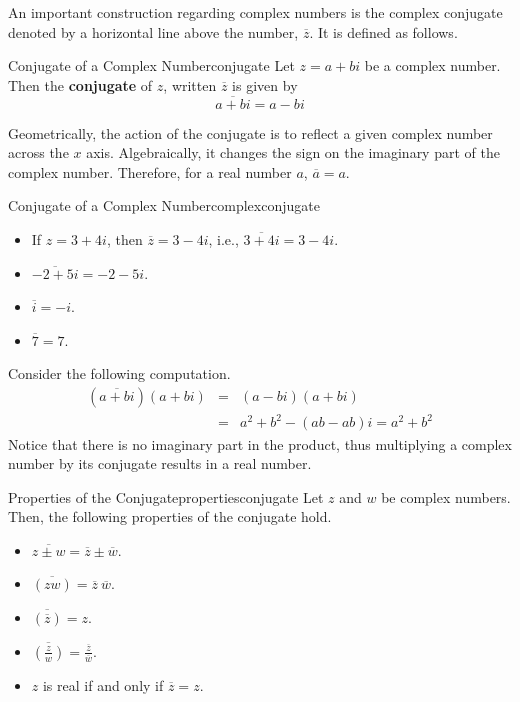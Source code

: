 An important construction regarding complex numbers is the complex
conjugate denoted by a horizontal line above the number, $\overline{z}$. It
is defined as follows.

\begin{definition}{Conjugate of a Complex Number}{conjugate}
Let $z = a+bi$ be a complex number. Then the \textbf{conjugate} of $z$, written $\overline{z}$ is given by 
\begin{equation*}
\overline{a+bi}= a-bi
\end{equation*}
\end{definition}

Geometrically, the action of the conjugate is to reflect a given complex number across the $x$ axis.
Algebraically, it changes the sign on the imaginary part of the complex number. Therefore, for a real number $a$, $\overline{a} = a$. 

\begin{example}{Conjugate of a Complex Number}{complexconjugate}
\begin{itemize}

\item If $z=3+4i$, then $\overline{z}=3-4i$,
i.e., $\overline{3+4i}=3-4i$.

\item $\overline{-2+5i}= -2-5i$.

\item $\overline{i}= -i$.

\item $\overline{7}= 7$.
\end{itemize}
\end{example}

Consider the following computation. 
\begin{eqnarray*}
\left( \overline{a+bi}\right) \left( a+bi\right) &=&\left( a-bi\right)
\left( a+bi\right) \\
&=&a^{2}+b^{2}-\left( ab-ab\right)i =a^{2}+b^{2}
\end{eqnarray*}
Notice that there is no imaginary part in the product, thus
multiplying a complex number by its conjugate results in  a real number.

\begin{theorem}{Properties of the Conjugate}{propertiesconjugate}
Let $z$ and $w$ be complex numbers. Then, the following properties of the conjugate hold.

\begin{itemize}
\item
$\overline{z\pm w} = \overline{z} \pm \overline{w}$.
\item
$\overline{(zw)} = \overline{z}~ \overline{w}$.
\item
$\overline{(\overline{z})}=z$.
\item
$\overline{\left(\frac{z}{w}\right)} =
\frac{\overline{z}}{\overline{w}}$.
\item
$z$ is real if and only if $\overline{z}=z$.
\end{itemize}
\end{theorem}

